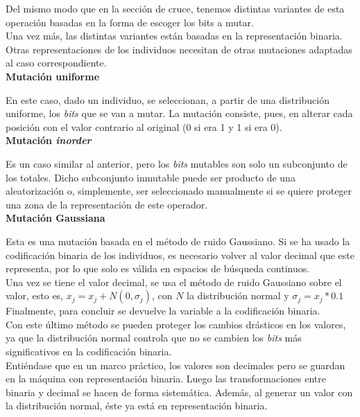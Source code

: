 			Del mismo modo que en la secci\'on de cruce, tenemos distintas variantes de esta operaci\'on basadas en la forma de escoger los bits a mutar.\\
			
			Una vez m\'as, las distintas variantes est\'an basadas en la representaci\'on binaria. Otras representaciones de los individuos necesitan de otras mutaciones adaptadas al caso correspondiente.\\
			
			\textbf{Mutaci\'on uniforme}

			En este caso, dado un individuo, se seleccionan, a partir de una distribuci\'on uniforme, los \textit{bits} que se van a mutar. La mutaci\'on consiste, pues, en alterar cada posici\'on con el valor contrario al original (0 si era 1 y 1 si era 0).\\			
		
		
			\textbf{Mutaci\'on \textit{inorder}}
		
			Es un caso similar al anterior, pero los \textit{bits} mutables son solo un subconjunto de los totales. Dicho subconjunto inmutable puede ser producto de una aleatorizaci\'on o, simplemente, ser seleccionado manualmente si se quiere proteger una zona de la representaci\'on de este operador.\\
			

			\textbf{Mutaci\'on Gaussiana}

			Esta es una mutaci\'on basada en el m\'etodo de ruido Gaussiano. Si se ha usado la codificaci\'on binaria de los individuos, es necesario volver al valor decimal que este representa, por lo que solo es v\'alida en espacios de b\'usqueda continuos.\\
			
			Una vez se tiene el valor decimal, se usa el m\'etodo de ruido Gaussiano sobre el valor, esto es, $x_j = x_j + N(0,\sigma_j)$, con $N$ la distribuci\'on normal y $\sigma_j = x_j * 0.1$\\
			
			Finalmente, para concluir se devuelve la variable a la codificaci\'on binaria.\\
			
			Con este \'ultimo m\'etodo se pueden proteger los cambios dr\'asticos en los valores, ya que la distribuci\'on normal controla que no se cambien los \textit{bits} m\'as significativos en la codificaci\'on binaria.\\
			
			Enti\'endase que en un marco pr\'actico, los valores son decimales pero se guardan en la m\'aquina con representaci\'on binaria. Luego las transformaciones entre binaria y decimal se hacen de forma sistem\'atica. Adem\'as, al generar un valor con la distribuci\'on normal, \'este ya est\'a en representaci\'on binaria.\\ 
							
